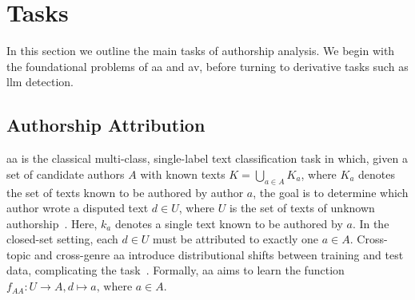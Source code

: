 \section{Tasks}
\label{sec:tasks}

In this section we outline the main tasks of authorship analysis. 
We begin with the foundational problems of \ac{aa} and \ac{av}, before turning to derivative tasks such as \ac{llm} detection.

\subsection{Authorship Attribution}
\ac{aa} is the classical multi-class, single-label text classification task in which, given a set of candidate authors $A$ with known texts $K=\bigcup_{a\in A} K_a$, where $K_a$ denotes the set of texts known to be authored by author $a$, the goal is to determine which author wrote a disputed text $d \in U$, where $U$ is the set of texts of unknown authorship~\citep{koppel_authorship_2004,barlas_cross_domain_2020}. 
Here, $k_a$ denotes a single text known to be authored by $a$.
In the closed-set setting, each $d \in U$ must be attributed to exactly one $a \in A$. 
Cross-topic and cross-genre \ac{aa} introduce distributional shifts between training and test data, complicating the task~\citep{barlas_cross_domain_2020}.
Formally, \ac{aa} aims to learn the function $f_{AA}: U \to A, d \mapsto a \text{, where } a \in A$.



